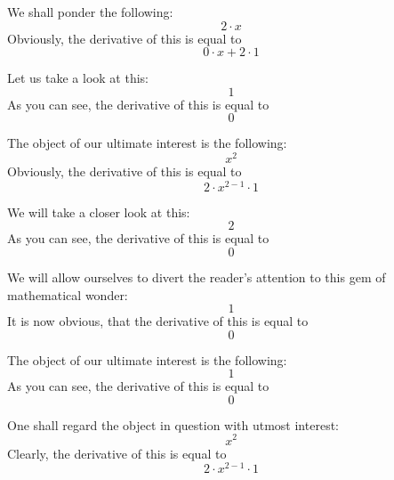 \documentclass{article}
\begin{document}
We shall ponder the following:
\begin{equation}
2 \cdot x 
\end{equation}
Obviously, the derivative of this is equal to
\begin{equation}
0 \cdot x + 2 \cdot 1 
\end{equation}

Let us take a look at this:
\begin{equation}
1 
\end{equation}
As you can see, the derivative of this is equal to
\begin{equation}
0 
\end{equation}

The object of our ultimate interest is the following:
\begin{equation}
x ^{2 } 
\end{equation}
Obviously, the derivative of this is equal to
\begin{equation}
2 \cdot x ^{2 - 1 } \cdot 1 
\end{equation}

We will take a closer look at this:
\begin{equation}
2 
\end{equation}
As you can see, the derivative of this is equal to
\begin{equation}
0 
\end{equation}

We will allow ourselves to divert the reader's attention to this gem of mathematical wonder:
\begin{equation}
1 
\end{equation}
It is now obvious, that the derivative of this is equal to
\begin{equation}
0 
\end{equation}

The object of our ultimate interest is the following:
\begin{equation}
1 
\end{equation}
As you can see, the derivative of this is equal to
\begin{equation}
0 
\end{equation}

One shall regard the object in question with utmost interest:
\begin{equation}
x ^{2 } 
\end{equation}
Clearly, the derivative of this is equal to
\begin{equation}
2 \cdot x ^{2 - 1 } \cdot 1 
\end{equation}
\end{document}
